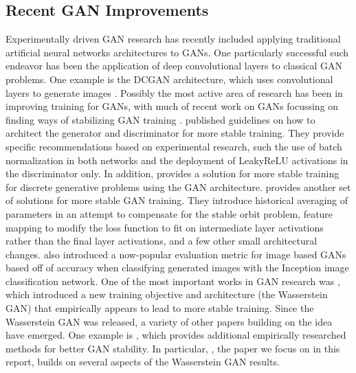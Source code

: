 \documentclass{article}
\begin{document}
\subsection{Recent GAN Improvements}
Experimentally driven GAN research has recently included applying traditional artificial neural networks architectures to GANs. One particularly successful such endeavor has been the application of deep convolutional layers to classical GAN problems. One example is the DCGAN architecture, which uses convolutional layers to generate images \citep{DBLP:journals/corr/RadfordMC15}. Possibly the most active area of research has been in improving training for GANs, with much of recent work on GANs focussing on finding ways of stabilizing GAN training \citep{Salimans2016} \citep{DBLP:journals/corr/ArjovskyCB17} \citep{DBLP:conf/nips/NowozinCT16} \citep{DBLP:journals/corr/MetzPPS16}. \citet{DBLP:journals/corr/RadfordMC15} published guidelines on how to architect the generator and discriminator for more stable training. They provide specific recommendations based on experimental research, such the use of batch normalization in both networks and the deployment of LeakyReLU activations in the discriminator only. In addition, \citet{DBLP:journals/corr/HjelmJCCB17} provides a solution for more stable training for discrete generative problems using the GAN architecture. \citet{Salimans2016} provides another set of solutions for more stable GAN training. They introduce historical averaging of parameters in an attempt to compensate for the stable orbit problem, feature mapping to modify the loss function to fit on intermediate layer activations rather than the final layer activations, and a few other small architectural changes. \citet{Salimans2016} also introduced a now-popular evaluation metric for image based GANs based off of accuracy when classifying generated images with the Inception image classification network. One of the most important works in GAN research was \citet{DBLP:journals/corr/ArjovskyCB17}, which introduced a new training objective and architecture (the Wasserstein GAN) that empirically appears to lead to more stable training. Since the Wasserstein GAN was released, a variety of other papers building on the idea have emerged. One example is \citet{DBLP:journals/corr/GulrajaniAADC17}, which provides additional empirically researched methods for better GAN stability. In particular, \citep{Arora17}, the paper we focus on in this report, builds on several aspects of the Wasserstein GAN results. 
\end{document}
